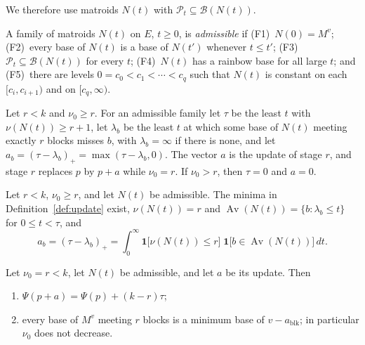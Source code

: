\documentclass[runningheads,envcountsame]{llncs}
\newcommand{\blk}{\operatorname{blk}}
\newcommand{\Bases}{\mathcal B}
\newcommand{\Pos}{\mathcal P}
\newcommand{\Av}{\operatorname{Av}}
\begin{document}
We therefore use matroids $N(t)$ with $\Pos_t\subseteq\Bases(N(t))$.

\begin{definition}
\label{def:admissible}
A family of matroids $N(t)$ on $E$, $t\ge0$, is \emph{admissible} if
(F1)~$N(0)=M^{v}$; (F2)~every base of $N(t)$ is a base of $N(t')$ whenever
$t\le t'$; (F3)~$\Pos_t\subseteq\Bases(N(t))$ for every $t$; (F4)~$N(t)$ has a
rainbow base for all large $t$; and (F5)~there are levels
$0=c_0<c_1<\cdots<c_q$ such that $N(t)$ is constant on each $[c_i,c_{i+1})$ and
on $[c_q,\infty)$.
\end{definition}

\begin{definition}
\label{def:update}
Let $r<k$ and $\nu_0\ge r$.  For an admissible family let $\tau$ be the least
$t$ with $\nu(N(t))\ge r+1$, let $\lambda_b$ be the least $t$ at which some base
of $N(t)$ meeting exactly $r$ blocks misses $b$, with $\lambda_b=\infty$ if there
is none, and let $a_b=(\tau-\lambda_b)_+=\max(\tau-\lambda_b,0)$.  The vector $a$ is
the update of stage $r$, and stage $r$ replaces $p$ by $p+a$ while $\nu_0=r$.  If $\nu_0>r$, then $\tau=0$ and $a=0$.
\end{definition}

\begin{lemma}
\label{lem:updint}
Let $r<k$, $\nu_0\ge r$, and let $N(t)$ be admissible.  The minima in
Definition~\ref{def:update} exist, $\nu(N(t))=r$ and
$\Av(N(t))=\{b:\lambda_b\le t\}$ for $0\le t<\tau$, and
\[
  a_b=(\tau-\lambda_b)_+
  =\int_0^{\infty}\mathbf 1\bigl[\nu(N(t))\le r\bigr]\;\mathbf 1\bigl[b\in\Av(N(t))\bigr]\,dt.
\]
\end{lemma}

\begin{theorem}[Validity]
\label{thm:validity}
Let $\nu_0=r<k$, let $N(t)$ be admissible, and let $a$ be its update.  Then
\begin{enumerate}
  \item $\Psi(p+a)=\Psi(p)+(k-r)\tau$;
  \item every base of $M^{v}$ meeting $r$ blocks is a minimum base of
        $v-a_{\blk}$; in particular $\nu_0$ does not decrease.
\end{enumerate}
\end{theorem}
\end{document}
